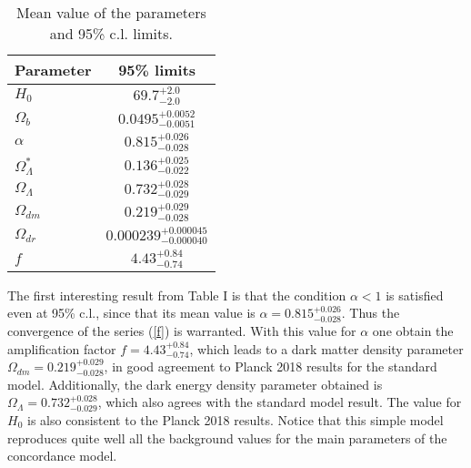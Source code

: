 \documentclass[preprintnumbers,amsmath,amssymb,nofootinbib]{revtex4}
\begin{document}
\begin{table}
    \centering
   \begin{tabular} { l  c}

 Parameter &  95\% limits\\
\hline
{\boldmath$H_0            $} & $69.7^{+2.0}_{-2.0}        $\\

{\boldmath$\Omega_{b}     $} & $0.0495^{+0.0052}_{-0.0051}$\\

{\boldmath$\alpha         $} & $0.815^{+0.026}_{-0.028}   $\\


{$\Omega_\Lambda^*          $} & $0.136^{+0.025}_{-0.022}   $\\

$\Omega_\Lambda            $ & $0.732^{+0.028}_{-0.029}   $\\

$\Omega_{dm}               $ & $0.219^{+0.029}_{-0.028}   $\\

$\Omega_{dr}               $ & $0.000239^{+0.000045}_{-0.000040}$\\

$f                         $ & $4.43^{+0.84}_{-0.74}      $\\
\hline
\end{tabular}
   
   
    \begin{center}
         \caption{Mean value of the parameters and 95\% c.l. limits.}
    \end{center}
 \label{Tab01}
\end{table}


The first interesting result from Table I is that the condition $\alpha < 1$ is satisfied even at 95\% c.l., since that its mean value is $\alpha = 0.815^{+0.026}_{-0.028}$. Thus the convergence of the series (\ref{f}) is warranted. With this value for $\alpha$ one obtain the amplification factor $f=4.43^{+0.84}_{-0.74}$, which leads to a dark matter density parameter $\Omega_{dm}=0.219^{+0.029}_{-0.028}$, in good agreement to Planck 2018 results \cite{Planck2018} for the standard model. Additionally, the dark energy density parameter obtained is $\Omega_{\Lambda}=0.732^{+0.028}_{-0.029}$, which also agrees with the standard model result. The value for $H_0$ is also consistent to the Planck 2018 results. Notice that this simple model reproduces quite well all the background values for the main parameters of the concordance model.
\end{document}
